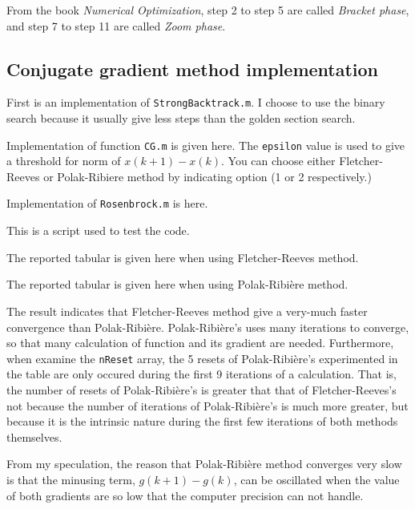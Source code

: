 \documentclass{article}
\begin{document}
From the book \emph{Numerical Optimization}, step 2 to step 5 are called \emph{Bracket phase}, and step 7 to step 11 are called \emph{Zoom phase}.

\subsection*{Conjugate gradient method implementation}

First is an implementation of \lstinline{StrongBacktrack.m}. I choose to use the binary search because it usually give less steps than the golden section search.



Implementation of function \lstinline{CG.m} is given here. The \lstinline{epsilon} value is used to give a threshold for norm of $x(k+1)-x(k)$. You can choose either Fletcher-Reeves or Polak-Ribiere method by indicating option (1 or 2 respectively.)



Implementation of \lstinline{Rosenbrock.m} is here.



This is a script used to test the code.



The reported tabular is given here when using Fletcher-Reeves method.



The reported tabular is given here when using Polak-Ribière method.



The result indicates that Fletcher-Reeves method give a very-much faster convergence than Polak-Ribière. Polak-Ribière's uses many iterations to converge, so that many calculation of function and its gradient are needed. Furthermore, when examine the \lstinline{nReset} array, the 5 resets of Polak-Ribière's experimented in the table are only occured during the first 9 iterations of a calculation. That is, the number of resets of Polak-Ribière's is greater that that of Fletcher-Reeves's not because the number of iterations of Polak-Ribière's is much more greater, but because it is the intrinsic nature during the first few iterations of both methods themselves.

From my speculation, the reason that Polak-Ribière method converges very slow is that the minusing term, $g(k+1)-g(k)$, can be oscillated when the value of both gradients are so low that the computer precision can not handle.
\end{document}
